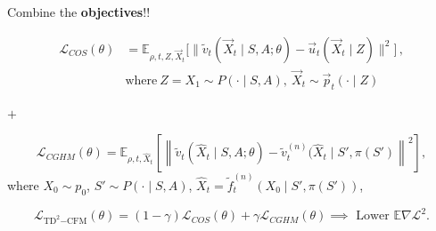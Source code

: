 \documentclass{beamer}
\begin{document}
    \begin{frame}
        Combine the \textbf{objectives}!!
\begin{blackblock}
    \[ \begin{aligned} \mathcal{L}_{COS}(\theta) &= \mathbb{E}_{\rho,t,Z,\vec{X}_t}\Big[\big\|\tilde{v}_t(\vec{X}_t\mid S, A; \theta) - \vec{u}_{t}(\vec{X}_t\mid Z)\big\|^2\Big]\,,\\ &\text{where}\ Z = X_1 \sim P(\cdot\mid S, A),\ \vec{X}_t \sim \vec{p}_{t}(\cdot\mid Z)\, \end{aligned} \]
\end{blackblock}
\begin{center}
    \Large
    \( + \)
\end{center}
\begin{blackblock}
    \[ \mathcal{L}_{CGHM}(\theta) = \mathbb{E}_{\rho,t,\widehat{X}_t} \left[ \left\| \tilde{v}_t(\widehat{X}_t \mid S, A; \theta) - \tilde{v}_t^{(n)}(\widehat{X}_t \mid S', \pi(S') \right\|^2 \right], \]where $X_0 \sim p_0$, $S' \sim P(\cdot \mid S, A)$, $\widehat{X}_t = \widetilde{f}_t^{(n)}(X_0 \mid S', \pi(S'))$,
\end{blackblock}
\vspace*{.5cm}
\[
    \mathcal{L}_{\mathrm{TD}^2\mathrm{-CFM}}(\theta) = (1 - \gamma) \mathcal{L}_{COS}(\theta) + \gamma \mathcal{L}_{CGHM}(\theta) \implies \text{ Lower }\mathbb{E}\nabla \mathcal{L}^2
.\] 
\end{frame}
\end{document}
